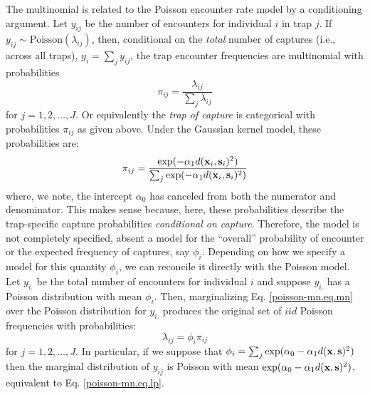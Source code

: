 The multinomial is related to the Poisson encounter rate
model by a conditioning argument. Let $y_{ij}$ be the number of
encounters for individual $i$ in trap $j$. If $y_{ij} \sim
\mbox{Poisson}(\lambda_{ij})$,
then,
conditional on the {\it total}
number of captures (i.e., across all traps), $y_{i} = \sum_{j}
y_{ij}$, the trap encounter frequencies are multinomial with
probabilities
\[
 \pi_{ij} =  \frac{ \lambda_{ij} } { \sum_{j} \lambda_{ij} }
\]
for $j=1,2,\ldots,J$.
Or equivalently the {\it trap of
  capture} is categorical with probabilities $\pi_{ij}$ as given above.
Under the Gaussian kernel model, these probabilities are:
\begin{equation}
\pi_{ij} =  \frac{ \exp(  -\alpha_{1}  d({\bf x}_{i},{\bf s}_{i})^2 ) }  {
   \sum_{j} \exp( -\alpha_{1} d({\bf x}_{i},{\bf s}_{i})^2)}
\label{poisson-mn.eq.mnprobs}
\end{equation}
where, we note, the intercept $\alpha_{0}$ has canceled from both the
numerator and denominator. This makes sense because, here, these
probabilities describe the trap-specific capture probabilities {\it
  conditional on capture}.  Therefore, the model is not completely
specified, absent a model for the ``overall'' probability of encounter
or the expected frequency of captures, say $\phi_{i}$. Depending on
how we specify a model for this quantity $\phi_{i}$, we can reconcile
it directly with the Poisson model.
Let $y_{i.}$ be the total number of encounters for individual $i$ and
suppose $y_{i.}$ has a Poisson distribution with mean $\phi_{i}$.
Then, marginalizing Eq. \ref{poisson-mn.eq.mn} over the Poisson
distribution for $y_{i.}$ produces the original set of
$iid$ %
Poisson
frequencies with probabilities:
\[
 \lambda_{ij} = \phi_{i} \pi_{ij}
\]
for $j=1,2,\ldots,J$.
In particular, if we suppose that
$\phi_{i} = \sum_{j} \exp(\alpha_{0} - \alpha_{1} d({\bf x},{\bf s})^2)$
then the marginal distribution of $y_{ij}$ is Poisson with mean $\exp(
\alpha_{0} - \alpha_{1} d({\bf x},{\bf s})^2 )$, equivalent to
Eq. \ref{poisson-mn.eq.lp}.

